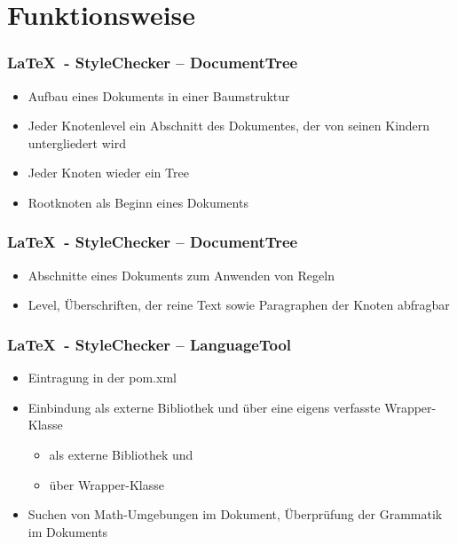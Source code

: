 \section{Funktionsweise}
\begin{frame}
\frametitle{\LaTeX~- StyleChecker -- DocumentTree}
\begin{block}{\vspace*{-3ex}}
	\begin{itemize}
		\item Aufbau eines Dokuments in einer Baumstruktur
		\item Jeder Knotenlevel ein Abschnitt des Dokumentes, der von seinen Kindern untergliedert wird
		\item Jeder Knoten wieder ein Tree
		\item Rootknoten als Beginn eines Dokuments
	\end{itemize}
\end{block}
\end{frame}
\begin{frame}
\frametitle{\LaTeX~- StyleChecker -- DocumentTree}
\begin{block}{\vspace*{-3ex}}
	\begin{itemize}
		\item Abschnitte eines Dokuments zum Anwenden von Regeln 
		\item Level, Überschriften, der reine Text sowie Paragraphen der Knoten abfragbar
	\end{itemize}
\end{block}
\end{frame}
\begin{frame}
\frametitle{\LaTeX~- StyleChecker -- LanguageTool}
\begin{block}{\vspace*{-3ex}}
	\begin{itemize}
		\item Eintragung in der pom.xml 
		\item Einbindung als externe Bibliothek und über eine eigens verfasste Wrapper-Klasse
		\begin{itemize}
			\item als externe Bibliothek und 
			\item über Wrapper-Klasse
		\end{itemize}
		\item Suchen von Math-Umgebungen im Dokument, Überprüfung der Grammatik im Dokuments
	\end{itemize}
\end{block}
\end{frame}
